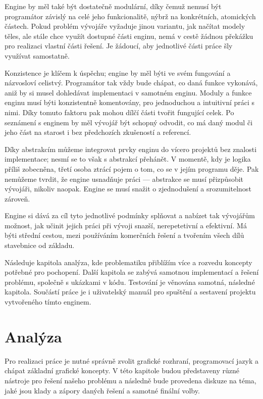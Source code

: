 \documentclass[12pt]{article}
\begin{document}
Engine by měl také být dostatečně modulární, díky čemuž nemusí být programátor závislý na celé jeho funkcionalitě, nýbrž na konkrétních, atomických částech. Pokud problém vývojáře vyžaduje jinou variantu, jak načítat modely těles, ale stále chce využít dostupné části enginu, nemá v cestě žádnou překážku pro realizaci vlastní části řešení. Je žádoucí, aby jednotlivé části práce šly využívat samostatně.

Konzistence je klíčem k úspěchu; engine by měl býti ve svém fungování a názvosloví celistvý. Programátor tak vždy bude chápat, co daná funkce vykonává, aniž by si musel dohledávat implementaci v samotném enginu. Moduly a funkce enginu musí býti konzistentně komentovány, pro jednoduchou a intuitivní práci s nimi. Díky tomuto faktoru pak mohou dílčí části tvořit fungující celek. Po seznámení s enginem by měl vývojář být schopný odvodit, co má daný modul či jeho část na starost i bez předchozích zkušeností a referencí.

Díky abstrakcím můžeme integrovat prvky enginu do vícero projektů bez znalosti implementace; nesmí se to však s abstrakcí přehánět. V momentě, kdy je logika příliš zobecněna, třetí osoba ztrácí pojem o tom, co se v jejím programu děje. Pak nemůžeme tvrdit, že engine usnadňuje práci — abstrakce se musí přizpůsobit vývojáři, nikoliv naopak. Engine se musí snažit o zjednodušení a srozumitelnost zároveň.

Engine si dává za cíl tyto jednotlivé podmínky splňovat a nabízet tak vývojářům možnost, jak učinit jejich práci při vývoji snazší, nerepetetivní a efektivní. Má býti střední cestou, mezi používáním komerčních řešení a tvořením všech dílů stavebnice od základu.

Následuje kapitola analýza, kde problematiku přiblížím více a rozvedu koncepty potřebné pro pochopení. Další kapitola se zabývá samotnou implementací a řešení problému, společně s ukázkami v kódu. Testování je věnována samotná, následné kapitola. Součástí práce je i uživatelský manuál pro spuštění a sestavení projektu vytvořeného tímto enginem.

\pagebreak

\section{Analýza}

Pro realizaci práce je nutné správně zvolit grafické rozhraní, programovací jazyk a chápat základní grafické koncepty. V této kapitole budou představeny různé nástroje pro řešení našeho problému a následně bude provedena diskuze na téma, jaké jsou klady a zápory daných řešení a samotné finální volby.
\end{document}
